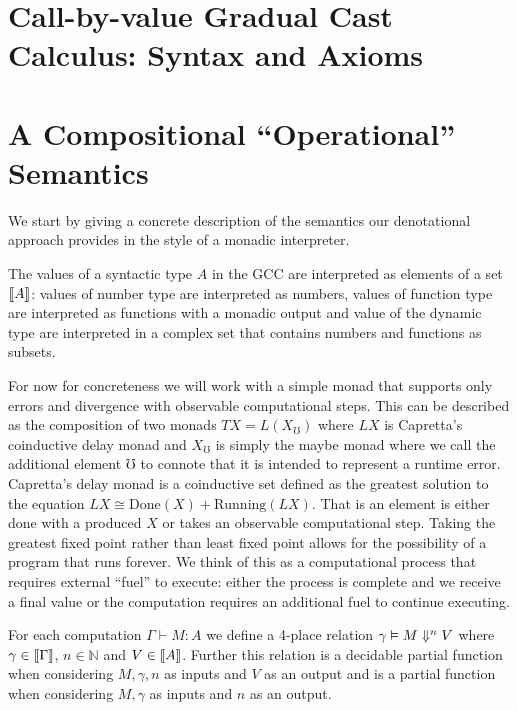\documentclass[acmsmall,screen]{acmart}
\begin{document}
\section{Call-by-value Gradual Cast Calculus: Syntax and Axioms}

\subsection{}

\section{A Compositional ``Operational'' Semantics}

We start by giving a concrete description of the semantics our
denotational approach provides in the style of a monadic
interpreter.

The values of a syntactic type $A$ in the GCC are interpreted as
elements of a set $\llbracket{}{A}\rrbracket{}$: values of number type are interpreted as
numbers, values of function type are interpreted as functions with a
monadic output and value of the dynamic type are interpreted in a complex
set that contains numbers and functions as subsets.

For now for concreteness we will work with a simple monad that
supports only errors and divergence with observable computational
steps. This can be described as the composition of two monads $T X =
L(X_\mho)$ where $LX$ is Capretta's coinductive delay monad and
$X_\mho$ is simply the maybe monad where we call the additional
element $\mho$ to connote that it is intended to represent a runtime
error.
%
Capretta's delay monad is a coinductive set defined as the greatest
solution to the equation $L X \cong \textrm{Done}(X)+
\textrm{Running}(LX)$. That is an element is either done with a
produced $X$ or takes an observable computational step. Taking the
greatest fixed point rather than least fixed point allows for the
possibility of a program that runs forever.
%
We think of this as a computational process that requires external
``fuel'' to execute: either the process is complete and we receive a
final value or the computation requires an additional fuel to continue
executing.
%

For each computation $\Gamma \vdash M : A$ we define a 4-place
relation $\gamma \vDash M \Downarrow^{n} V$ where $\gamma \in
\llbracket{}{\Gamma}\rrbracket{}$, $n \in \mathbb N$ and $V \in \llbracket{}{A}\rrbracket{}$. Further this
relation is a decidable partial function when considering $M,\gamma,n$
as inputs and $V$ as an output and is a partial function when
considering $M,\gamma$ as inputs and $n$ as an output.
\end{document}
